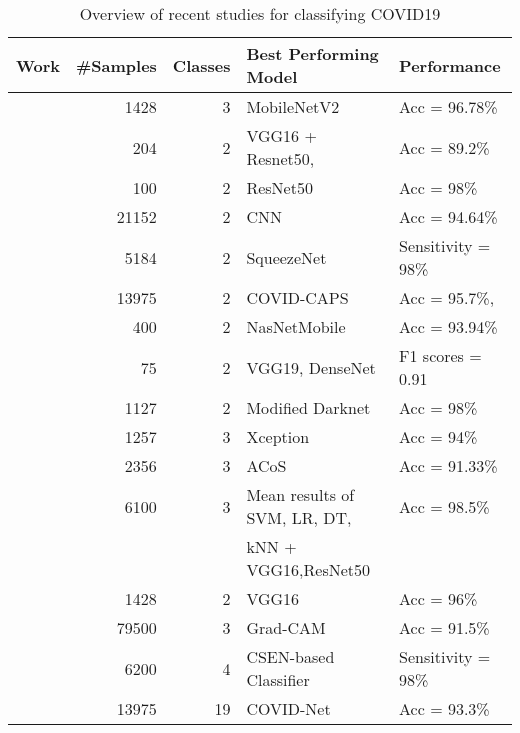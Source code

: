 
\begin{table}[htbp]
\caption{\label{tbl:related}Overview of recent studies for classifying COVID19}
\begin{center}
\begin{adjustbox}{angle=90}
\begin{tabular}{|l|r|r|l|l|}%
\hline
Work &  \#Samples &  Classes &  Best Performing Model &   Performance \\
\hline
\hline
~\cite{35apostolopoulos2020covid} & 1428 &    3 &   MobileNetV2 & Acc = 96.78\%  \\
\hline
~\cite{36hall2020finding} &  204 &    2 & VGG16 + Resnet50, &    Acc = 89.2\% \\
\hline           
~\cite{37narin2021automatic} &  100 &    2 &   ResNet50 &  Acc = 98\% \\
\hline
~\cite{38tang2020automated} &    21152 &    2 &    CNN &   Acc = 94.64\% \\
\hline
~\cite{39minaee2020deep}  & 5184 &    2 &   SqueezeNet & Sensitivity = 98\%\\
\hline
~\cite{40afshar2020covid}  &    13975 &    2 &   COVID-CAPS &   Acc = 95.7\%, \\
\hline
~\cite{41ahsan2020covid}  &  400 &    2 &  NasNetMobile &   Acc = 93.94\% \\
\hline
~\cite{42hemdan2020covidx}  &   75 &    2 &   VGG19, DenseNet &   F1 scores = 0.91 \\
\hline
~\cite{43ozturk2020automated}  & 1127 &    2 &  Modified Darknet &  Acc = 98\% \\
\hline
~\cite{44khan2020coronet}  & 1257 &    3 &  Xception &  Acc = 94\% \\
\hline
~\cite{45chandra2021coronavirus} & 2356 &    3 &  ACoS &   Acc = 91.33\% \\
\hline
~\cite{46sekeroglu2020covid19} & 6100 &    3 & Mean results of SVM, LR, DT, & Acc = 98.5\% \\
  &   &      &   kNN + VGG16,ResNet50  &        \\
\hline
~\cite{47pandit2021automatic}& 1428 &    2 &  VGG16 &  Acc = 96\% \\
\hline
~\cite{48arias2020artificial} &    79500 &    3 &    Grad-CAM &    Acc = 91.5\% \\
\hline
~\cite{49yamac2021convolutional} & 6200 &    4 & CSEN-based Classifier &    Sensitivity = 98\% \\
\hline
~\cite{50wang2020covid} &    13975 &   19 &  COVID-Net &    Acc = 93.3\% \\

\end{tabular}
\end{adjustbox}
\end{center}
\end{table}
